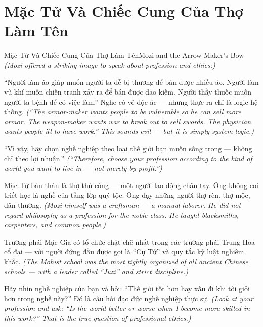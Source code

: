\section{Mặc Tử Và Chiếc Cung Của Thợ Làm Tên}
\begin{truyen}{Mặc Tử Và Chiếc Cung Của Thợ Làm Tên}{Mozi and the Arrow-Maker's Bow}
\textit{(Mozi offered a striking image to speak about profession and ethics:)}

``Người làm áo giáp muốn người ta dễ bị thương để bán được nhiều áo. Người làm vũ khí muốn chiến tranh xảy ra để bán được dao kiếm. Người thầy thuốc muốn người ta bệnh để có việc làm.'' Nghe có vẻ độc ác — nhưng thực ra chỉ là logic hệ thống.
\textit{(``The armor-maker wants people to be vulnerable so he can sell more armor. The weapon-maker wants war to break out to sell swords. The physician wants people ill to have work.'' This sounds evil — but it is simply system logic.)}

``Vì vậy, hãy chọn nghề nghiệp theo loại thế giới bạn muốn sống trong — không chỉ theo lợi nhuận.''
\textit{(``Therefore, choose your profession according to the kind of world you want to live in — not merely by profit.'')}

Mặc Tử bản thân là thợ thủ công — một người lao động chân tay. Ông không coi triết học là nghề của tầng lớp quý tộc. Ông dạy những người thợ rèn, thợ mộc, dân thường.
\textit{(Mozi himself was a craftsman — a manual laborer. He did not regard philosophy as a profession for the noble class. He taught blacksmiths, carpenters, and common people.)}

Trường phái Mặc Gia có tổ chức chặt chẽ nhất trong các trường phái Trung Hoa cổ đại — với người đứng đầu được gọi là ``Cự Tử'' và quy tắc kỷ luật nghiêm khắc.
\textit{(The Mohist school was the most tightly organized of all ancient Chinese schools — with a leader called ``Juzi'' and strict discipline.)}

\end{truyen}

\begin{baihoc}
Hãy nhìn nghề nghiệp của bạn và hỏi: ``Thế giới tốt hơn hay xấu đi khi tôi giỏi hơn trong nghề này?'' Đó là câu hỏi đạo đức nghề nghiệp thực sự.
\textit{(Look at your profession and ask: ``Is the world better or worse when I become more skilled in this work?'' That is the true question of professional ethics.)}
\end{baihoc}
\ngancach

